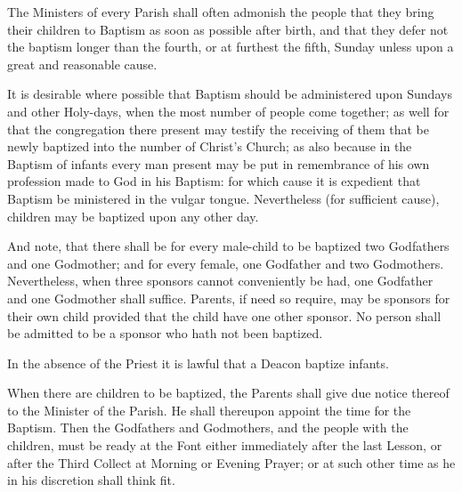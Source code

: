 
\small

\begin{leftbar}

\begin{rubric}
The Ministers of every Parish shall often admonish the people that they bring their children to Baptism as soon as possible after birth, and that they defer not the baptism longer than the fourth, or at furthest the fifth, Sunday unless upon a great and reasonable cause.
\end{rubric}

\begin{rubric}
It is desirable where possible that Baptism should be administered upon Sundays and other Holy-days, when the most number of people come together; as well for that the congregation there present may testify the receiving of them that be newly baptized into the number of Christ's Church; as also because in the Baptism of infants every man present may be put in remembrance of his own profession made to God in his Baptism: for which cause it is expedient that Baptism be ministered in the vulgar tongue.
Nevertheless (for sufficient cause), children may be baptized upon any other day.
\end{rubric}

\begin{rubric}
And note, that there shall be for every male-child to be baptized two Godfathers and one Godmother; and for every female, one Godfather and two Godmothers.
Nevertheless, when three sponsors cannot conveniently be had, one Godfather and one Godmother shall suffice.
Parents, if need so require, may be sponsors for their own child provided that the child have one other sponsor.
No person shall be admitted to be a sponsor who hath not been baptized.
\end{rubric}

\begin{rubric}
In the absence of the Priest it is lawful that a Deacon baptize infants.
\end{rubric}

\begin{rubric}
When there are children to be baptized, the Parents shall give due notice thereof to the Minister of the Parish.
He shall thereupon appoint the time for the Baptism.
Then the Godfathers and Godmothers, and the people with the children, must be ready at the Font either immediately after the last Lesson, or after the Third Collect at Morning or Evening Prayer; or at such other time as he in his discretion shall think fit.
\end{rubric}

\end{leftbar}

